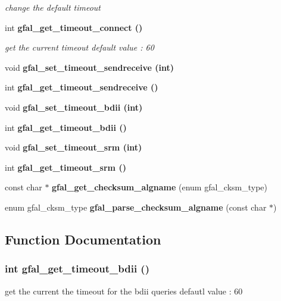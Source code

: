 \begin{CompactItemize}
\begin{CompactList}\small\item\em change the default timeout \item\end{CompactList}\item 
int \bf{gfal\_\-get\_\-timeout\_\-connect} ()\label{group__common__group_g63ec5d282f39173b678ecad2d60a4a6f}

\begin{CompactList}\small\item\em get the current timeout default value : 60 \item\end{CompactList}\item 
void \bf{gfal\_\-set\_\-timeout\_\-sendreceive} (int)
\item 
int \bf{gfal\_\-get\_\-timeout\_\-sendreceive} ()
\item 
void \bf{gfal\_\-set\_\-timeout\_\-bdii} (int)
\item 
int \bf{gfal\_\-get\_\-timeout\_\-bdii} ()
\item 
void \bf{gfal\_\-set\_\-timeout\_\-srm} (int)
\item 
int \bf{gfal\_\-get\_\-timeout\_\-srm} ()
\item 
const char $\ast$ \textbf{gfal\_\-get\_\-checksum\_\-algname} (enum gfal\_\-cksm\_\-type)\label{group__common__group_g11dd2ec58a632427ae12b710006c15a5}

\item 
enum gfal\_\-cksm\_\-type \textbf{gfal\_\-parse\_\-checksum\_\-algname} (const char $\ast$)\label{group__common__group_g0ac1b12c9af897b63173fd73043e1669}

\end{CompactItemize}


\subsection{Function Documentation}
\subsubsection{\setlength{\rightskip}{0pt plus 5cm}int gfal\_\-get\_\-timeout\_\-bdii ()}\label{group__common__group_g676f0d746479f2c9893609854099d614}


get the current the timeout for the bdii queries defautl value : 60 
